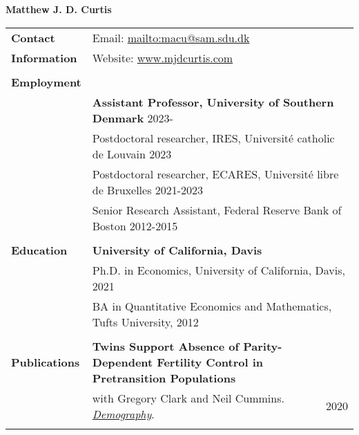\documentclass[a4paper,11pt,oneside]{article}
\begin{document}

\noindent  \LARGE{\textbf{Matthew J. D. Curtis}}  \\

\normalsize




\noindent \begin{longtable}{@{} p{0.175\linewidth} p{0.775\linewidth} p{0.05\linewidth}}
   
   
   
   \textbf{\large{Contact}}    &  \multicolumn{2}{l}{Email: \href{mailto:macu@sam.sdu.dk}{mailto:macu@sam.sdu.dk} }\\
   \textbf{\large{Information}}  &  \multicolumn{2}{l}{Website: \href{https://www.mjdcurtis.com/}{www.mjdcurtis.com} }\\
   \\ 
   
   \textbf{\large{Employment}}   \\
   &  \multicolumn{2}{l}{  \textbf{Assistant Professor, University of Southern Denmark} \hfill  2023-}\\
   &  \multicolumn{2}{l}{ Postdoctoral researcher, IRES, Universit\'{e} catholic de Louvain \hfill  2023}\\
   &  \multicolumn{2}{l}{ Postdoctoral researcher, ECARES, Universit\'{e} libre de Bruxelles \hfill  2021-2023}\\
   &  \multicolumn{2}{l}{ Senior Research Assistant, Federal Reserve Bank of Boston \hfill  2012-2015}\\
   \\
   \textbf{\large{Education}}    & \multicolumn{2}{l}{\textbf{University of California, Davis}} \\
   &  \multicolumn{2}{l}{Ph.D. in Economics, University of California, Davis, 2021}\\
   &  \multicolumn{2}{l}{BA in Quantitative Economics and Mathematics, Tufts University, 2012}\\
   \\
   
   \textbf{\large{Publications}}   & \textbf{Twins Support Absence of Parity-Dependent Fertility Control in Pretransition Populations }\\
   &  with Gregory Clark and Neil Cummins. \href{https://read.dukeupress.edu/demography/article/57/4/1571/168109/Twins-Support-the-Absence-of-Parity-Dependent}{\emph{Demography}}. & \hfill 2020\\
   \\  
   

\end{longtable}
\end{document}
